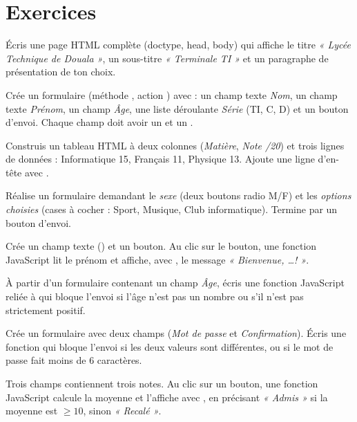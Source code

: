 \section{Exercices}


Écris une page HTML complète (doctype, head, body) qui affiche le titre
\emph{« Lycée Technique de Douala »}, un sous-titre \emph{« Terminale TI »} et un
paragraphe de présentation de ton choix.

Crée un formulaire (méthode , action ) avec : un champ
texte \emph{Nom}, un champ texte \emph{Prénom}, un champ  \emph{Âge},
une liste déroulante \emph{Série} (TI, C, D) et un bouton d'envoi. Chaque champ doit
avoir un  et un .

Construis un tableau HTML à deux colonnes (\emph{Matière}, \emph{Note /20}) et trois
lignes de données : Informatique 15, Français 11, Physique 13. Ajoute une ligne
d'en-tête avec .

Réalise un formulaire demandant le \emph{sexe} (deux boutons radio M/F) et les
\emph{options choisies} (cases à cocher : Sport, Musique, Club informatique).
Termine par un bouton d'envoi.

Crée un champ texte () et un bouton. Au clic sur le bouton, une
fonction JavaScript lit le prénom et affiche, avec , le message
\emph{« Bienvenue, \dots ! »}.


À partir d'un formulaire contenant un champ \emph{Âge}, écris une fonction
JavaScript reliée à  qui bloque l'envoi si l'âge n'est pas un nombre
ou s'il n'est pas strictement positif.

Crée un formulaire avec deux champs  (\emph{Mot de passe} et
\emph{Confirmation}). Écris une fonction qui bloque l'envoi si les deux valeurs sont
différentes, ou si le mot de passe fait moins de 6 caractères.

Trois champs  contiennent trois notes. Au clic sur un bouton, une
fonction JavaScript calcule la moyenne et l'affiche avec , en précisant
\emph{« Admis »} si la moyenne est $\geq 10$, sinon \emph{« Recalé »}.

